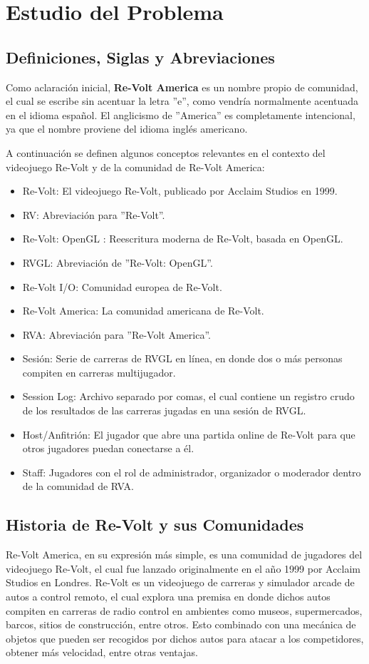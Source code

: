 \chapter{Estudio del Problema}

\section{Definiciones, Siglas y Abreviaciones}
Como aclaración inicial, \textbf{Re-Volt America} es un nombre propio de comunidad, el cual se escribe sin acentuar la letra ''e'', como vendría normalmente acentuada en el idioma español. El anglicismo de ''America'' es completamente intencional, ya que el nombre proviene del idioma inglés americano.

A continuación se definen algunos conceptos relevantes en el contexto del videojuego Re-Volt y de la comunidad de Re-Volt America:

\begin{itemize}
	\item Re-Volt: El videojuego Re-Volt, publicado por Acclaim Studios en 1999.
	\item RV: Abreviación para ''Re-Volt''.
	\item Re-Volt: OpenGL \cite{rvgl}: Reescritura moderna de Re-Volt, basada en OpenGL.
	\item RVGL: Abreviación de ''Re-Volt: OpenGL''.
	\item Re-Volt I/O: Comunidad europea de Re-Volt.
	\item Re-Volt America: La comunidad americana de Re-Volt.
	\item RVA: Abreviación para ''Re-Volt America''.
	\item Sesión: Serie de carreras de RVGL en línea, en donde dos o más personas compiten en carreras multijugador.
	\item Session Log: Archivo separado por comas, el cual contiene un registro crudo de los resultados de las carreras jugadas en una sesión de RVGL.
 	\item Host/Anfitrión: El jugador que abre una partida online de Re-Volt para que otros jugadores puedan conectarse a él.
 	\item Staff: Jugadores con el rol de administrador, organizador o moderador dentro de la comunidad de RVA.
\end{itemize}

\section{Historia de Re-Volt y sus Comunidades}
Re-Volt America, en su expresión más simple, es una comunidad de jugadores del videojuego Re-Volt, el cual fue lanzado originalmente en el año 1999 por Acclaim Studios en Londres. Re-Volt es un videojuego de carreras y simulador arcade de autos a control remoto, el cual explora una premisa en donde dichos autos compiten en carreras de radio control en ambientes como museos, supermercados, barcos, sitios de construcción, entre otros. Esto combinado con una mecánica de objetos que pueden ser recogidos por dichos autos para atacar a los competidores, obtener más velocidad, entre otras ventajas.

